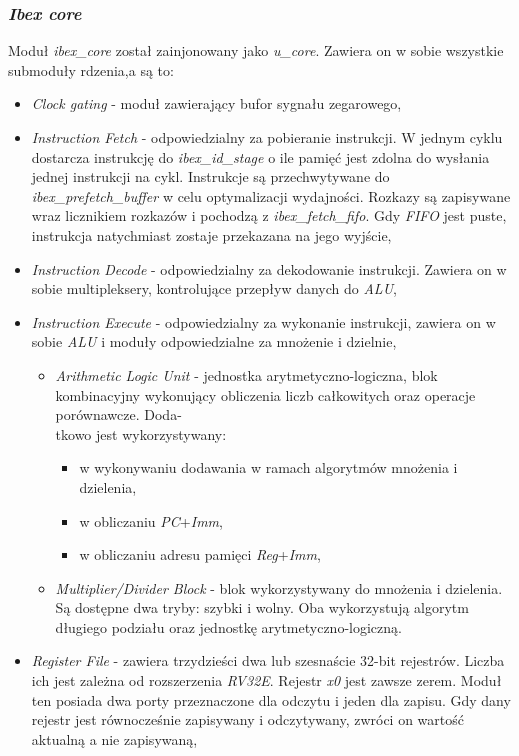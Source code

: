 \documentclass[11pt,a4paper]{article}
\begin{document}
	\subsubsection{\textit{Ibex core}}
	\hspace{5mm}
		Moduł \textit{ibex\_core} został zainjonowany jako \textit{u\_core}. Zawiera on w sobie wszystkie submoduły rdzenia,a są to:
\begin{itemize}
	\item \textit{Clock gating} - moduł zawierający bufor sygnału zegarowego,
	\item \textit{Instruction Fetch} - odpowiedzialny za pobieranie instrukcji. W jednym cyklu dostarcza instrukcję do \textit{ibex\_id\_stage} o ile pamięć jest zdolna do wysłania jednej instrukcji na cykl. Instrukcje są przechwytywane do \textit{ibex\_prefetch\_buffer} w celu optymalizacji wydajności. Rozkazy są zapisywane wraz licznikiem rozkazów i pochodzą z \textit{ibex\_fetch\_fifo}. Gdy  \textit{FIFO} jest puste, instrukcja natychmiast zostaje przekazana na jego wyjście,
	\item \textit{Instruction Decode} - odpowiedzialny za dekodowanie instrukcji. Zawiera on w sobie multipleksery, kontrolujące przepływ danych do \textit{ALU},
	\item \textit{Instruction Execute} - odpowiedzialny za wykonanie instrukcji, zawiera on w sobie \textit{ALU} i moduły odpowiedzialne za mnożenie i dzielnie, 
	\begin{itemize}
		\item \textit{Arithmetic Logic Unit} - jednostka arytmetyczno-logiczna, blok kombinacyjny wykonujący obliczenia liczb całkowitych oraz operacje porównawcze.
		Doda-\\tkowo jest wykorzystywany:
		\begin{itemize}
			\item w wykonywaniu dodawania w ramach algorytmów mnożenia i dzielenia,
			\item w obliczaniu \textit{PC}+\textit{Imm},
			\item w obliczaniu adresu pamięci \textit{Reg}+\textit{Imm},
		\end{itemize}
		\item \textit{Multiplier/Divider Block} - blok wykorzystywany do mnożenia i dzielenia. Są dostępne dwa tryby: szybki i wolny. Oba wykorzystują algorytm długiego podziału oraz jednostkę arytmetyczno-logiczną.
	\end{itemize}
		\item \textit{\textit{Register File}} - zawiera trzydzieści dwa lub szesnaście 32-bit rejestrów. Liczba ich jest zależna od rozszerzenia \textit{RV32E}. Rejestr \textit{x0} jest zawsze zerem. Moduł ten posiada dwa porty przeznaczone dla odczytu i jeden dla zapisu. Gdy dany rejestr jest równocześnie zapisywany i odczytywany, zwróci on wartość aktualną a nie zapisywaną,

\end{itemize}
\end{document}
